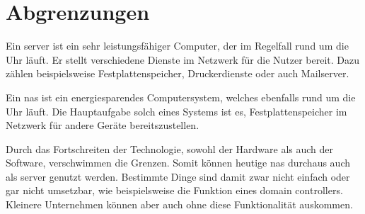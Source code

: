

\section{Abgrenzungen}

Ein \gls{server} ist ein sehr leistungsfähiger Computer, der im Regelfall rund
um die Uhr läuft. Er stellt verschiedene Dienste im Netzwerk für die Nutzer
bereit. Dazu zählen beispielsweise Festplattenspeicher, Druckerdienste oder
auch Mailserver.
\bigskip

Ein \gls{nas} ist ein energiesparendes Computersystem, welches ebenfalls rund
um die Uhr läuft. Die Hauptaufgabe solch eines Systems ist es, Festplattenspeicher
im Netzwerk für andere Geräte bereitszustellen.
\bigskip

Durch das Fortschreiten der Technologie, sowohl der Hardware als auch der
Software, verschwimmen die Grenzen. Somit können heutige \gls{nas} durchaus
auch als \gls{server} genutzt werden. Bestimmte Dinge sind damit zwar nicht
einfach oder gar nicht umsetzbar, wie beispielsweise die Funktion eines
\gls{domain controller}s. Kleinere Unternehmen können aber auch ohne diese
Funktionalität auskommen.
